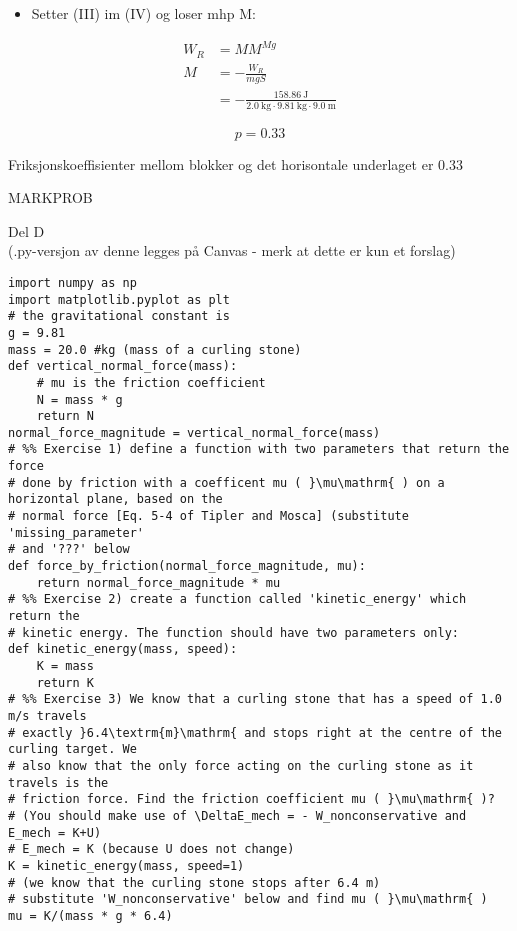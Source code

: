 \documentclass[10pt]{article}
\begin{document}
\begin{itemize}
  \item Setter (III) im (IV) og loser mhp M:
\end{itemize}

$$
\begin{aligned}
W_{R} & =M M^{M g} \\
M & =-\frac{W_{R}}{m g S} \\
& =-\frac{158.86 \mathrm{~J}}{2.0 \mathrm{~kg} \cdot 9.81 \mathrm{~kg} \cdot 9.0 \mathrm{~m}}
\end{aligned}
$$

$$
p=0.33
$$

Friksjonskoeffisienter mellom blokker og det horisontale underlaget er 0.33

MARKPROB

Del D\\
(.py-versjon av denne legges på Canvas - merk at dette er kun et forslag)

\begin{verbatim}
import numpy as np
import matplotlib.pyplot as plt
# the gravitational constant is
g = 9.81
mass = 20.0 #kg (mass of a curling stone)
def vertical_normal_force(mass):
    # mu is the friction coefficient
    N = mass * g
    return N
normal_force_magnitude = vertical_normal_force(mass)
# %% Exercise 1) define a function with two parameters that return the force
# done by friction with a coefficent mu ( }\mu\mathrm{ ) on a horizontal plane, based on the
# normal force [Eq. 5-4 of Tipler and Mosca] (substitute 'missing_parameter'
# and '???' below
def force_by_friction(normal_force_magnitude, mu):
    return normal_force_magnitude * mu
# %% Exercise 2) create a function called 'kinetic_energy' which return the
# kinetic energy. The function should have two parameters only:
def kinetic_energy(mass, speed):
    K = mass
    return K
# %% Exercise 3) We know that a curling stone that has a speed of 1.0 m/s travels
# exactly }6.4\textrm{m}\mathrm{ and stops right at the centre of the curling target. We
# also know that the only force acting on the curling stone as it travels is the
# friction force. Find the friction coefficient mu ( }\mu\mathrm{ )?
# (You should make use of \DeltaE_mech = - W_nonconservative and E_mech = K+U)
# E_mech = K (because U does not change)
K = kinetic_energy(mass, speed=1)
# (we know that the curling stone stops after 6.4 m)
# substitute 'W_nonconservative' below and find mu ( }\mu\mathrm{ )
mu = K/(mass * g * 6.4)
\end{verbatim}
\end{document}

